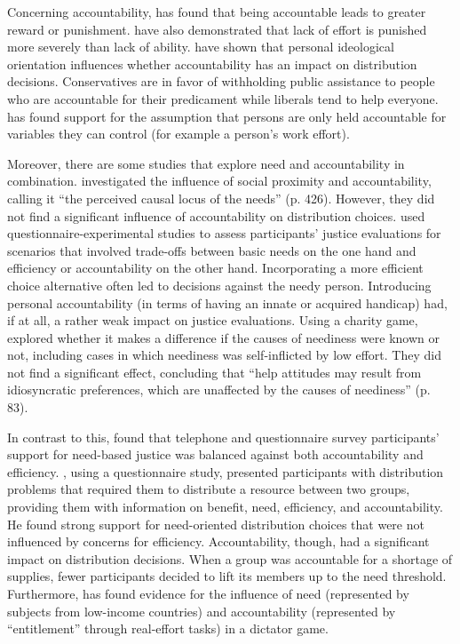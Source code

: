 \documentclass[smallcondensed]{svjour3}
\begin{document}
%
Concerning accountability, \citet{weiner_sin_1993} has found that being accountable leads to greater reward or punishment. \citet{weiner_attributional_1970} have also demonstrated that lack of effort is punished more severely than lack of ability. \citet{mellers_ants_1993, skitka_providing_1993} have shown that personal ideological orientation influences whether accountability has an impact on distribution decisions. Conservatives are in favor of withholding public assistance to people who are accountable for their predicament while liberals tend to help everyone. \citet{konow_positive_1996} has found support for the assumption that persons are only held accountable for variables they can control (for example a person's work effort).\par
%
Moreover, there are some studies that explore need and accountability in combination. \citet{lamm_norms_1980} investigated the influence of social proximity and accountability, calling it ``the perceived causal locus of the needs'' (p. 426). However, they did not find a significant influence of accountability on distribution choices. \citet{gaertner_equity_2007} used questionnaire-experimental studies to assess participants' justice evaluations for scenarios that involved trade-offs between basic needs on the one hand and efficiency or accountability on the other hand. Incorporating a more efficient choice alternative often led to decisions against the needy person. Introducing personal accountability (in terms of having an innate or acquired handicap) had, if at all, a rather weak impact on justice evaluations. Using a charity game, \citet{buitrago_relation_2009} explored whether it makes a difference if the causes of neediness were known or not, including cases in which neediness was self-inflicted by low effort. They did not find a significant effect, concluding that ``help attitudes may result from idiosyncratic preferences, which are unaffected by the causes of neediness'' (p. 83).\par
%
In contrast to this, \citet{konow_fair_2001} found that telephone and questionnaire survey participants' support for need-based justice was balanced against both accountability and efficiency. \citet{schwettmann_competing_2012}, using a questionnaire study, presented participants with distribution problems that required them to distribute a resource between two groups, providing them with information on benefit, need, efficiency, and accountability. He found strong support for need-oriented distribution choices that were not influenced by concerns for efficiency. Accountability, though, had a significant impact on distribution decisions. When a group was accountable for a shortage of supplies, fewer participants decided to lift its members up to the need threshold. Furthermore, \citet{cappelen_needs_2013} has found evidence for the influence of need (represented by subjects from low-income countries) and accountability (represented by ``entitlement'' through real-effort tasks) in a dictator game.\par
\end{document}
